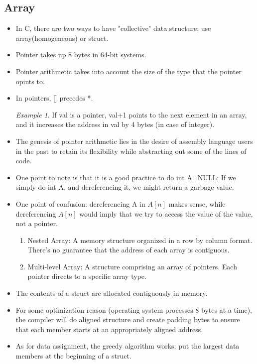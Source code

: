 \documentclass[11pt,reqno]{amsart}
\theoremstyle{remark}
\newtheorem{example}{Example}
\begin{document}
\subsection*{Array}
\begin{itemize}
\item In C, there are two ways to have "collective" data structure; 
use array(homogeneous) or struct.
\item Pointer takes up 8 bytes in 64-bit systems.
\item Pointer arithmetic takes into account the size of the 
type that the pointer opints to.
\item In pointers, [] precedes *.
\begin{example}
If val is a pointer, val+1 points to the next element in an array, 
and it increases the address in val by 4 bytes (in case of integer).
\end{example}
\item The genesis of pointer arithmetic lies in the desire of assembly 
language users in the past to retain its flexibility while abstracting out
 some of the lines of code.
\item One point to note is that it is a good practice to do int \*A=NULL;
  If we simply do int \*A, and dereferencing it, we might return a garbage value.
\item One point of confusion: dereferencing A in $A[n]$ makes sense, while dereferencing
   $A[n]$ would imply that we try to access the value of the value, not a pointer.
\begin{enumerate}
\item Nested Array: A memory structure organized in a row by column format.
 There's no guarantee that the address of each array is contiguous.
\item Multi-level Array: A structure comprising an array of pointers. Each pointer directs 
to a specific array type.
\end{enumerate}
\item The contents of a struct are allocated contiguously in memory.
\item For some optimization reason (operating system processes 8 bytes at a time), the compiler will do aligned structure and create padding bytes to
 ensure that each member starts at an appropriately aligned address.
\item As for data assignment, the greedy algorithm works; put the largest data members at the beginning of a struct.
\end{itemize}
\end{document}
